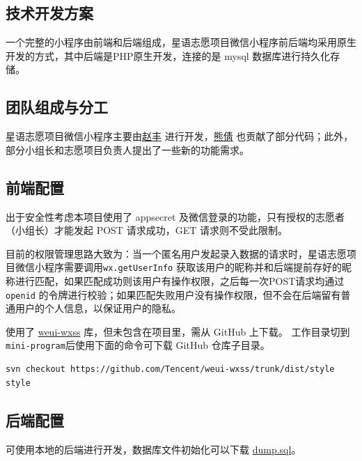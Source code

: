 \documentclass[]{ctexart}
\begin{document}
\subsection{技术开发方案}\label{ux6280ux672fux5f00ux53d1ux65b9ux6848}

一个完整的小程序由前端和后端组成，星语志愿项目微信小程序前后端均采用原生开发的方式，其中后端是PHP原生开发，连接的是
mysql 数据库进行持久化存储。

\subsection{团队组成与分工}\label{ux56e2ux961fux7ec4ux6210ux4e0eux5206ux5de5}

星语志愿项目微信小程序主要由\href{https://github.com/zhaofeng-shu33}{赵丰}
进行开发，\href{https://github.com/Prisicilla}{熊倩}
也贡献了部分代码；此外，部分小组长和志愿项目负责人提出了一些新的功能需求。

\subsection{前端配置}\label{ux524dux7aefux914dux7f6e}

出于安全性考虑本项目使用了 appsecret
及微信登录的功能，只有授权的志愿者（小组长）才能发起 POST 请求成功，GET
请求则不受此限制。

目前的权限管理思路大致为：当一个匿名用户发起录入数据的请求时，星语志愿项目微信小程序需要调用\texttt{wx.getUserInfo}
获取该用户的昵称并和后端提前存好的昵称进行匹配，如果匹配成功则该用户有操作权限，之后每一次POST请求均通过
\texttt{openid}
的令牌进行校验；如果匹配失败用户没有操作权限，但不会在后端留有普通用户的个人信息，以保证用户的隐私。

使用了 \href{https://github.com/Tencent/weui-wxss}{weui-wxss}
库，但未包含在项目里，需从 GitHub 上下载。 工作目录切到
\texttt{mini-program}后使用下面的命令可下载 GitHub 仓库子目录。

\begin{lstlisting}[breaklines=true]
svn checkout https://github.com/Tencent/weui-wxss/trunk/dist/style style
\end{lstlisting}



\subsection{后端配置}\label{ux540eux7aefux914dux7f6e}

可使用本地的后端进行开发，数据库文件初始化可以下载
\href{https://www.leidenschaft.cn/xingyu/mysql_dump.sql}{dump.sql}。
\end{document}

